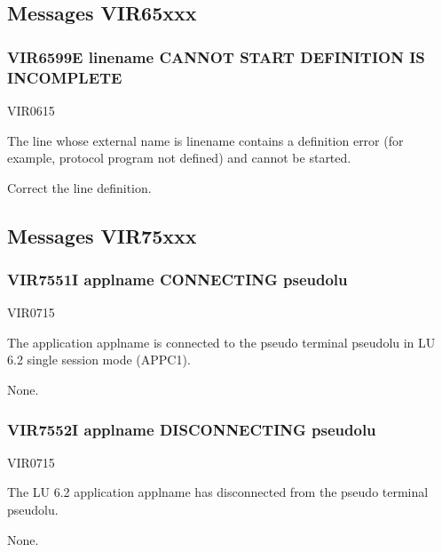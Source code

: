 \documentclass[letterpaper,10pt,english]{sphinxmanual}
\begin{document}
\subsection{Messages VIR65xxx}
\label{\detokenize{messages:messages-vir65xxx}}

\subsubsection{VIR6599E linename CANNOT START \sphinxhyphen{}DEFINITION IS INCOMPLETE}
\label{\detokenize{messages:vir6599e-linename-cannot-start-definition-is-incomplete}}\begin{description}
\sphinxAtStartPar
VIR0615

\sphinxAtStartPar
The line whose external name is linename contains a definition error (for example, protocol program not defined) and cannot be started.

\sphinxAtStartPar
Correct the line definition.

\end{description}


\subsection{Messages VIR75xxx}
\label{\detokenize{messages:messages-vir75xxx}}

\subsubsection{VIR7551I applname CONNECTING pseudolu}
\label{\detokenize{messages:vir7551i-applname-connecting-pseudolu}}\begin{description}
\sphinxAtStartPar
VIR0715

\sphinxAtStartPar
The application applname is connected to the pseudo terminal pseudolu in LU 6.2 single session mode (APPC1).

\sphinxAtStartPar
None.

\end{description}


\subsubsection{VIR7552I applname DISCONNECTING pseudolu}
\label{\detokenize{messages:vir7552i-applname-disconnecting-pseudolu}}\begin{description}
\sphinxAtStartPar
VIR0715

\sphinxAtStartPar
The LU 6.2 application applname has disconnected from the pseudo terminal pseudolu.

\sphinxAtStartPar
None.

\end{description}
\end{document}

